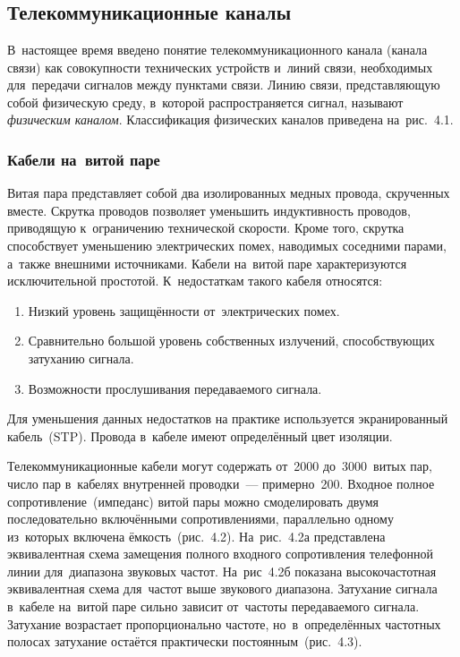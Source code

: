 \documentclass[
	a4paper,
	oneside,
	BCOR = 10mm,
	DIV = 12,
	12pt,
	headings = normal,
]{scrartcl}
\newcommand{\allcaps}[1]{{\addfontfeatures{LetterSpace = 8, Kerning = Off}#1}}
\begin{document}
	\section{}
		\subsection{Телекоммуникационные каналы}
			В~настоящее время введено понятие телекоммуникационного канала (канала связи) как совокупности технических устройств и~линий связи, необходимых для~передачи сигналов между пунктами связи. Линию связи, представляющую собой физическую среду, в~которой распространяется сигнал, называют \emph{физическим каналом}. Классификация физических каналов приведена на~рис.~4.1.

			\subsubsection{Кабели на~витой паре}
				Витая пара представляет собой два изолированных медных провода, скрученных вместе. Скрутка проводов позволяет уменьшить индуктивность проводов, приводящую к~ограничению технической скорости. Кроме того, скрутка способствует уменьшению электрических помех, наводимых соседними парами, а~также внешними источниками. Кабели на~витой паре характеризуются исключительной простотой. К~недостаткам такого кабеля относятся:
			\begin{enumerate}
				\item Низкий уровень защищённости от~электрических помех.
				\item Сравнительно большой уровень собственных излучений, способствующих затуханию сигнала.
				\item Возможности прослушивания передаваемого сигнала.
			\end{enumerate}
			Для уменьшения данных недостатков на практике используется экранированный кабель~(\allcaps{STP}). Провода в~кабеле имеют определённый цвет изоляции.

			Телекоммуникационные кабели могут содержать от~2000 до~3000~витых пар, число пар в~кабелях внутренней проводки~— примерно~200. Входное полное сопротивление~(импеданс) витой пары можно смоделировать двумя последовательно включёнными сопротивлениями, параллельно одному из~которых включена ёмкость~(рис.~4.2). На~рис.~4.2а представлена эквивалентная схема замещения полного входного сопротивления телефонной линии для~диапазона звуковых частот. На~рис~4.2б показана высокочастотная эквивалентная схема для~частот выше звукового диапазона. Затухание сигнала в~кабеле на~витой паре сильно зависит от~частоты передаваемого сигнала. Затухание возрастает пропорционально частоте, но~в~определённых частотных полосах затухание остаётся практически постоянным~(рис.~4.3).
\end{document}
